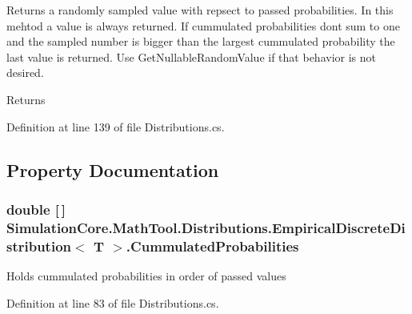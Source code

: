 Returns a randomly sampled value with repsect to passed probabilities. In this mehtod a value is always returned. If cummulated probabilities don\textquotesingle{}t sum to one and the sampled number is bigger than the largest cummulated probability the last value is returned. Use Get\+Nullable\+Random\+Value if that behavior is not desired. 

\begin{DoxyReturn}{Returns}

\end{DoxyReturn}


Definition at line 139 of file Distributions.\+cs.



\subsection{Property Documentation}
\subsubsection[{\texorpdfstring{Cummulated\+Probabilities}{CummulatedProbabilities}}]{\setlength{\rightskip}{0pt plus 5cm}double \mbox{[}$\,$\mbox{]} {\bf Simulation\+Core.\+Math\+Tool.\+Distributions.\+Empirical\+Discrete\+Distribution}$<$ T $>$.Cummulated\+Probabilities\hspace{0.3cm}{\ttfamily [get]}}\hypertarget{class_simulation_core_1_1_math_tool_1_1_distributions_1_1_empirical_discrete_distribution_a0aafcf9a4e2c43b7dc8f45366324c3c5}{}\label{class_simulation_core_1_1_math_tool_1_1_distributions_1_1_empirical_discrete_distribution_a0aafcf9a4e2c43b7dc8f45366324c3c5}


Holds cummulated probabilities in order of passed values 



Definition at line 83 of file Distributions.\+cs.

